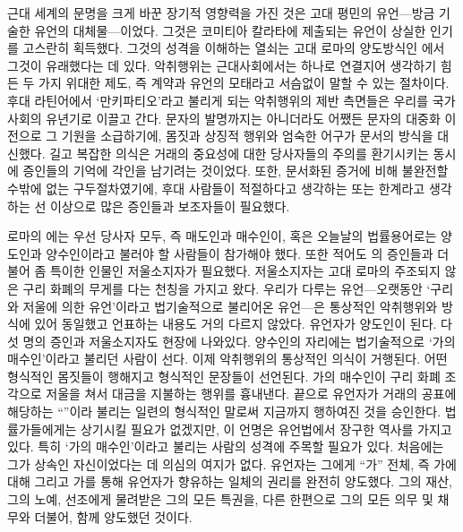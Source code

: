 근대 세계의 문명을 크게 바꾼 장기적 영향력을 가진 것은
고대 평민의 유언---방금 기술한 유언의 대체물---이었다.
그것은 코미티아 칼라타에 제출되는 유언이 상실한 인기를 고스란히 획득했다.
그것의 성격을 이해하는 열쇠는
고대 로마의 양도방식인
에서
그것이
유래했다는 데 있다.
악취행위는 근대사회에서는 하나로 연결지어 생각하기 힘든
두 가지 위대한 제도, 즉 계약과 유언의 모태라고 서슴없이 말할 수 있는 절차이다.
후대 라틴어에서 `만키파티오'라고 불리게 되는
악취행위의 제반 측면들은 우리를 국가사회의 유년기로 이끌고 간다.
문자의 발명까지는 아니더라도 어쨌든 문자의 대중화 이전으로
그 기원을 소급하기에,
몸짓과 상징적 행위와 엄숙한 어구가 문서의 방식을 대신했다.
길고 복잡한 의식은 거래의 중요성에 대한
당사자들의 주의를 환기시키는 동시에 증인들의 기억에 각인을 남기려는 것이었다.
또한, 문서화된 증거에 비해 불완전할 수밖에 없는 구두절차였기에,
후대 사람들이 적절하다고 생각하는 또는 한계라고 생각하는 선 이상으로 많은
증인들과 보조자들이 필요했다.

로마의 에는 우선 당사자 모두, 즉 매도인과 매수인이,
혹은 오늘날의 법률용어로는 양도인과 양수인이라고 불러야 할 사람들이
참가해야 했다.
또한 적어도 의 증인들과 더불어 좀 특이한 인물인
저울소지자가 필요했다.
저울소지자는 고대 로마의 주조되지 않은 구리 화폐의 무게를 다는
천칭을 가지고 왔다.
우리가 다루는 유언---오랫동안
`구리와 저울에 의한 유언'이라고
법기술적으로 불리어온 유언---은
통상적인 악취행위와 방식에 있어 동일했고
언표하는 내용도 거의 다르지 않았다.
유언자가 양도인이 된다.
다섯 명의 증인과 저울소지자도 현장에 나와있다.
양수인의 자리에는 법기술적으로
%
`가의 매수인'이라고 불리던 사람이 선다.
이제 악취행위의 통상적인 의식이 거행된다.
어떤 형식적인 몸짓들이 행해지고 형식적인 문장들이 선언된다.
가의 매수인이
구리 화폐 조각으로 저울을 쳐서 대금을 지불하는 행위를 흉내낸다.
끝으로 유언자가
거래의 공표에 해당하는 ``''이라
불리는 일련의 형식적인 말로써 지금까지 행하여진 것을 승인한다.
법률가들에게는 상기시킬 필요가 없겠지만, 이 언명은
유언법에서 장구한 역사를 가지고 있다.
특히 `가의 매수인'이라고 불리는 사람의 성격에 주목할 필요가 있다.
처음에는 그가 상속인 자신이었다는 데 의심의 여지가 없다.
유언자는 그에게 ``가'' 전체, 즉
가에 대해 그리고 가를 통해 유언자가 향유하는 일체의 권리를 완전히 양도했다.
그의 재산, 그의 노예, 선조에게 물려받은 그의 모든 특권을,
다른 한편으로 그의 모든 의무 및 채무와 더불어, 함께 양도했던 것이다.


